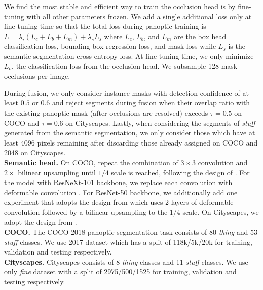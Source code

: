 \documentclass[10pt,twocolumn,letterpaper]{article}
\begin{document}
We find the most stable and efficient way to train the occlusion head is by fine-tuning with all other parameters frozen. We add a single additional loss only at fine-tuning time so that the total loss during panoptic training is $L = \lambda_i(L_c + L_b + L_m) + \lambda_s L_s$ where $L_c$, $L_b$, and $L_m$ are the box head classification loss, bounding-box regression loss, and mask loss while $L_s$ is the semantic segmentation cross-entropy loss. At fine-tuning time, we only minimize $L_o$, the classification loss from the occlusion head. We subsample 128 mask occlusions per image.

During fusion, we only consider instance masks with detection confidence of at least $0.5$ or $0.6$ and reject segments during fusion when their overlap ratio with the existing panoptic mask (after occlusions are resolved) exceeds $\tau = 0.5$ on COCO and $\tau = 0.6$ on Cityscapes. Lastly, when considering the segments of \textit{stuff} generated from the semantic segmentation, we only consider those which have at least 4096 pixels remaining after discarding those already assigned on COCO and 2048 on Cityscapes.\\
\noindent \textbf{Semantic head.} On COCO, repeat the combination of $3\times3$ convolution and $2\times$ bilinear upsampling until $1/4$ scale is reached, following the design of \cite{kirillov2019panoptic}. For the model with ResNeXt-101 backbone, we replace each convolution with deformable convolution \cite{deformable-conv}. For ResNet-50 backbone, we additionally add one experiment that adopts the design from \cite{xiong2019upsnet} which uses 2 layers of deformable convolution followed by a bilinear upsampling to the $1/4$ scale. On Cityscapes, we adopt the design from \cite{xiong2019upsnet}. \\
\noindent \textbf{COCO.} The COCO 2018 panoptic segmentation task consists of 80 \textit{thing} and 53 \textit{stuff} classes. We use 2017 dataset which has a split of 118k/5k/20k for training, validation and testing respectively.\\
\noindent \textbf{Cityscapes.} Cityscapes consists of 8 \textit{thing} classes and 11 \textit{stuff} classes. We use only \textit{fine} dataset with a split of 2975/500/1525 for training, validation and testing respectively.\\
\end{document}
